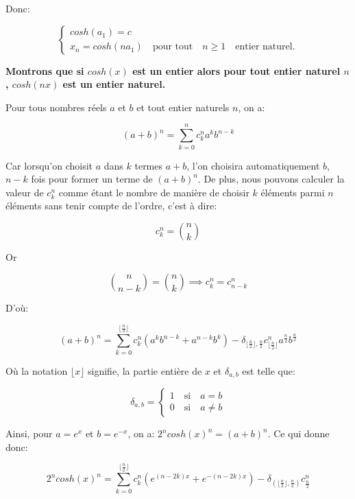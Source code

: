 \documentclass[12pt,a4paper,article]{memoir}
\newcommand{\floor}[1]{\lfloor #1 \rfloor}
\begin{document}
Donc:

\begin{equation}
\left\{
	\begin{array}{l}
cosh(a_{1}) = c\\
x_{n} = cosh(na_{1}) \quad \textrm{pour tout} \quad n \geq 1 \quad \textrm{entier naturel}.
\end{array}
\right.
\label{equation-pb-3-reccur-xn}
\end{equation}

\bigskip

\textbf{Montrons que si $cosh(x)$ est un entier alors pour tout entier naturel $n$, $cosh(nx)$ est un entier naturel.}

\bigskip

Pour tous nombres réels $a$ et $b$ et tout entier naturels $n$, on a:

\[(a + b)^n = \sum_{k=0}^{n} c_{k}^{n} a^{k}b^{n-k}\]

Car lorsqu'on choisit $a$ dans $k$ termes $a + b$, l'on choisira automatiquement $b$, $n-k$ fois pour former un terme de $(a+b)^n$. De plus, nous pouvons calculer la valeur de $c_{k}^{n}$ comme étant le nombre de manière de choisir $k$ éléments parmi $n$ éléments sans tenir compte de l'ordre, c'est à dire:

\[c_{k}^{n} = \binom{n}{k} \]

Or 

\[\binom{n}{n-k} = \binom{n}{k} \implies c_{k}^{n} = c_{n-k}^{n}\]

D'où:

\begin{equation}
(a + b)^n  = \sum_{k=0}^{\floor{\frac{n}{2}}} c_{k}^{n} (a^{k}b^{n-k} + a^{n-k}b^{k}) - \delta_{\floor{\frac{n}{2}}, \frac{n}{2}} c_{\floor{\frac{n}{2}}}^{n} a^{\frac{n}{2}}b^{\frac{n}{2}}
\label{equation-pb-3-sumabpown-2}
\end{equation}
 
 Où la notation $\floor{x}$ signifie, la partie entière de $x$ et $\delta_{a,b}$ est telle que:
 
 \[\delta_{a, b} = \left\{
	\begin{array}{l}
	1 \quad \textrm{si} \quad a = b\\
	0 \quad \textrm{si} \quad a \neq b
	\end{array}
\right.\]

Ainsi, pour $a = e^{x}$ et $b = e^{-x}$, on a: $2^{n}cosh(x)^{n} = (a + b)^{n}$. Ce qui donne donc:

\[
2^{n}cosh(x)^{n} = \sum_{k=0}^{\floor{\frac{n}{2}}} c_{k}^{n} (e^{(n-2k)x} + e^{-(n-2k)x}) - \delta_{(\floor{\frac{n}{2}}, \frac{n}{2})} c_{\frac{n}{2}}^{n}
\]
\end{document}
